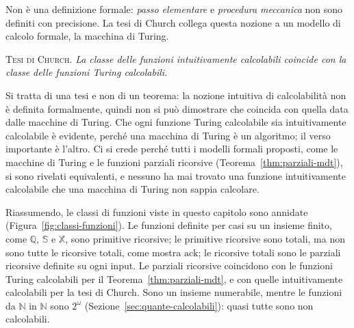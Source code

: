 \documentclass[a4paper, 11pt, oneside]{book}
\theoremstyle{formale}
\begin{document}
    Non \`e una definizione formale: \emph{passo elementare} e \emph{procedura
    meccanica} non sono definiti con precisione. La tesi di Church collega questa
    nozione a un modello di calcolo formale, la macchina di Turing.
    \medskip

    \textsc{Tesi di Church}. \textit{La classe delle funzioni intuitivamente calcolabili
    coincide con la classe delle funzioni Turing calcolabili.}

    \medskip
    Si tratta di una tesi e non di un teorema: la nozione intuitiva di calcolabilit\`a
    non \`e definita formalmente, quindi non si pu\`o dimostrare che coincida con quella
    data dalle macchine di Turing. Che ogni funzione Turing calcolabile sia
    intuitivamente calcolabile \`e evidente, perch\'e una macchina di Turing \`e un
    algoritmo; il verso importante \`e l'altro. Ci si crede perch\'e tutti i modelli
    formali proposti, come le macchine di Turing e le funzioni parziali ricorsive
    (Teorema~\ref{thm:parziali-mdt}), si sono rivelati equivalenti, e nessuno ha mai
    trovato una funzione intuitivamente calcolabile che una macchina di Turing non sappia
    calcolare.

    Riassumendo, le classi di funzioni viste in questo capitolo sono annidate
    (Figura~\ref{fig:classi-funzioni}). Le funzioni definite per casi su un insieme
    finito, come $\mathbb{Q}$, $\mathbb{S}$ e $\mathbb{X}$, sono primitive ricorsive; le
    primitive ricorsive sono totali, ma non sono tutte le ricorsive totali, come mostra
    $\mathrm{ack}$; le ricorsive totali sono le parziali ricorsive definite su ogni input.
    Le parziali ricorsive coincidono con le funzioni Turing calcolabili per il
    Teorema~\ref{thm:parziali-mdt}, e con quelle intuitivamente calcolabili per la tesi
    di Church. Sono un insieme numerabile, mentre le funzioni da $\mathbb{N}$ in
    $\mathbb{N}$ sono $2^\omega$ (Sezione~\ref{sec:quante-calcolabili}): quasi tutte sono
    non calcolabili.
\end{document}
